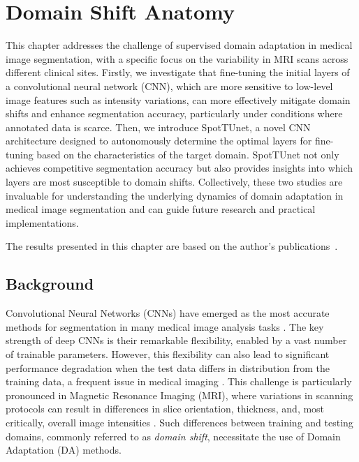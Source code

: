 

\chapter{Domain Shift Anatomy}
\label{chap:mri}


This chapter addresses the challenge of supervised domain adaptation in medical image segmentation, with a specific focus on the variability in MRI scans across different clinical sites. Firstly, we investigate that fine-tuning the initial layers of a convolutional neural network (CNN), which are more sensitive to low-level image features such as intensity variations, can more effectively mitigate domain shifts and enhance segmentation accuracy, particularly under conditions where annotated data is scarce. Then, we introduce SpotTUnet, a novel CNN architecture designed to autonomously determine the optimal layers for fine-tuning based on the characteristics of the target domain. SpotTUnet not only achieves competitive segmentation accuracy but also provides insights into which layers are most susceptible to domain shifts. Collectively, these two studies are invaluable for understanding the underlying dynamics of domain adaptation in medical image segmentation and can guide future research and practical implementations.

The results presented in this chapter are based on the author’s publications~\cite{shirokikh2020first,zakazov2021anatomy}.


\section{Background}

Convolutional Neural Networks (CNNs) have emerged as the most accurate methods for segmentation in many medical image analysis tasks \cite{shen2017deep}. The key strength of deep CNNs is their remarkable flexibility, enabled by a vast number of trainable parameters. However, this flexibility can also lead to significant performance degradation when the test data differs in distribution from the training data, a frequent issue in medical imaging \cite{wang2018deep}. This challenge is particularly pronounced in Magnetic Resonance Imaging (MRI), where variations in scanning protocols can result in differences in slice orientation, thickness, and, most critically, overall image intensities \cite{kamnitsas2017unsupervised,glocker2019machine,orbes2019multi}. Such differences between training and testing domains, commonly referred to as \textit{domain shift}, necessitate the use of Domain Adaptation (DA) methods.

